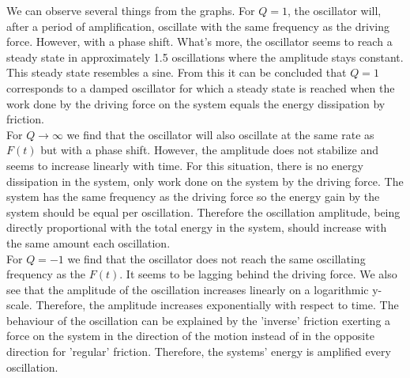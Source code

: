 We can observe several things from the graphs. For $Q = 1$, the oscillator will, after a period of amplification, oscillate with the same frequency as the driving force. However, with a phase shift. What's more, the oscillator seems to reach a steady state in approximately 1.5 oscillations where the amplitude stays constant. This steady state resembles a sine. From this it can be concluded that $Q = 1$ corresponds to a damped oscillator for which a steady state is reached when the work done by the driving force on the system equals the energy dissipation by friction. \\
For $Q \rightarrow \infty$ we find that the oscillator will also oscillate at the same rate as $F(t)$ but with a phase shift. However, the amplitude does not stabilize and seems to increase linearly with time. For this situation, there is no energy dissipation in the system, only  work done on the system by the driving force. The system has the same frequency as the driving force so the energy gain by the system should be equal per oscillation. Therefore the oscillation amplitude, being directly proportional with the total energy in the system, should increase with the same amount each oscillation. \\
For $Q = -1$ we find that the oscillator does not reach the same oscillating frequency as the $F(t)$. It seems to be lagging behind the driving force. We also see that the amplitude of the oscillation increases linearly on a logarithmic y-scale. Therefore, the amplitude increases exponentially with respect to time. The behaviour of the oscillation can be explained by the 'inverse' friction exerting a force on the system in the direction of the motion instead of in the opposite direction for 'regular' friction. Therefore, the systems' energy is amplified every oscillation.